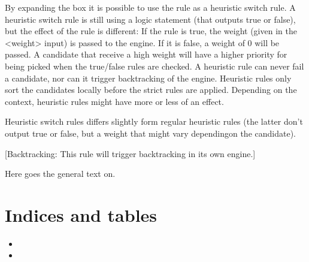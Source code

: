 \documentclass[letterpaper,10pt,english]{sphinxmanual}
\begin{document}
\begin{description}
\begin{itemize}
\end{itemize}


By expanding the box it is possible to use the rule as a heuristic switch rule. A heuristic switch rule is still using a logic statement (that outputs true or false), but the effect of the rule is different: If the rule is true, the weight (given in the \textless{}weight\textgreater{} input) is passed to the engine. If it is false, a weight of 0 will be passed. A candidate that receive a high weight will have a higher priority for being picked when the true/false rules are checked. A heuristic rule can never fail a candidate, nor can it trigger backtracking of the engine. Heuristic rules only sort the candidates locally before the strict rules are applied. Depending on the context, heuristic rules might have more or less of an effect.

Heuristic switch rules differs slightly form regular heuristic rules (the latter don’t output true or false, but a weight that might vary dependingon the candidate).

{[}Backtracking: This rule will trigger backtracking in its own engine.{]}

\end{description}

Here goes the general text on.


\chapter{Indices and tables}
\label{\detokenize{index:indices-and-tables}}\begin{itemize}
\item {} 

\item {} 

\end{itemize}



\renewcommand{\indexname}{Index}
\printindex
\end{document}
